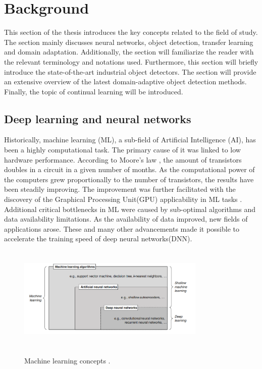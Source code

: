 \section{Background}
This section of the thesis introduces the key concepts related to the field of study. The section mainly discusses neural networks, object detection, transfer learning and domain adaptation. Additionally, the section will familiarize the reader with the relevant terminology and notations used. Furthermore, this section will briefly introduce the state-of-the-art industrial object detectors. The section will provide an extensive overview of the latest domain-adaptive object detection methods. Finally, the topic of  continual learning will be introduced. 
\subsection{Deep learning and neural networks}
Historically, machine learning (ML), a sub-field of Artificial Intelligence (AI), has been a highly computational task. The primary cause of it was linked to low hardware performance. According to Moore's law \cite{Etiemble2022}, the amount of transistors doubles in a circuit in a given number of months.  As the computational power of the computers grew proportionally to the number of transistors, the results have been steadily improving. The improvement was further facilitated with the discovery of the Graphical Processing Unit(GPU) applicability in ML tasks \cite{Hwang2018}. Additional critical bottlenecks in ML were caused by sub-optimal algorithms and data availability limitations. As the availability of data improved, new fields of applications arose. These and many other advancements made it possible to accelerate the training speed of deep neural networks(DNN).  

\begin{figure}[htb]
	\begin{center}
		\includegraphics[width=0.8\textwidth,height=50mm]{./ml1.png}
	\end{center}
	\caption{Machine learning concepts \cite{Janiesch2021}.}
	\begin{center}
		\label{MLConcepts}
	\end{center}
\end{figure}


